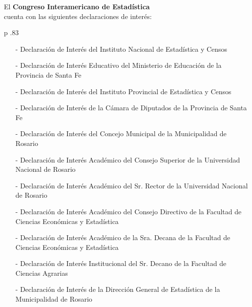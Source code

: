 \documentclass[12pt,a4paper]{article}
\begin{document}
\begin{center}
El {\bfseries Congreso Interamericano de Estadística}\\cuenta con las siguientes declaraciones de interés:\\ 
\end{center}


\begin{longtable}{ p {.83\textwidth}}  

\begin{itemize}
\item[-] Declaración de Interés del Instituto Nacional de Estadística y Censos
\item[-] Declaración de Interés Educativo del Ministerio de Educación de la Provincia de Santa Fe
\item[-] Declaración de Interés del Instituto Provincial de Estadística y Censos
\item[-] Declaración de Interés de la Cámara de Diputados de la Provincia de Santa Fe
\item[-] Declaración de Interés del Concejo Municipal de la Municipalidad de Rosario
\item[-] Declaración de Interés Académico del Consejo Superior de la Universidad Nacional de Rosario
\item[-] Declaración de Interés Académico del Sr. Rector de la Universidad Nacional de Rosario
\item[-] Declaración de Interés Académico del Consejo Directivo de la Facultad de Ciencias Económicas y Estadística
\item[-] Declaración de Interés Académico de la Sra. Decana de la Facultad de Ciencias Económicas y Estadística
\item[-] Declaración de Interés Institucional del Sr. Decano de la Facultad de Ciencias Agrarias
\item[-] Declaración de Interés de la Dirección General de Estadística de la Municipalidad de Rosario
\end{itemize}\\
\end{longtable}


%

\end{document}
